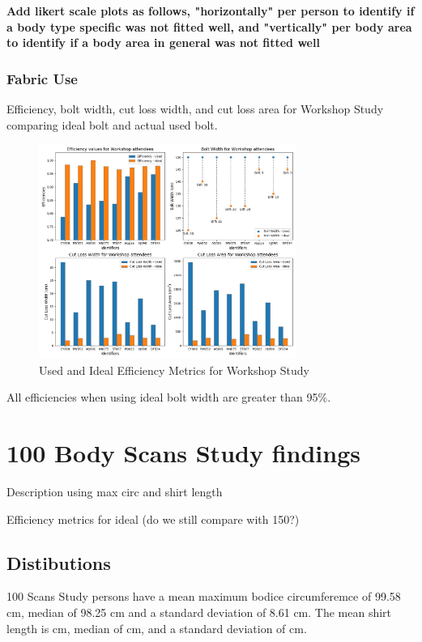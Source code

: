 \textbf{Add likert scale plots as follows, "horizontally" per person to identify if a body type specific was not fitted well, and "vertically" per body area to identify if a body area in general was not fitted well}

\subsubsection{Fabric Use}
Efficiency, bolt width, cut loss width, and cut loss area for Workshop Study comparing ideal bolt and actual used bolt.
\begin{figure} [H] %
    \centering %
    \includegraphics[width = 0.75\textwidth]{Images/Workshop_Plot.png} %
    \caption{Used and Ideal Efficiency Metrics for Workshop Study}
\end{figure}
All efficiencies when using ideal bolt width are greater than 95\%. 



\section{100 Body Scans Study findings}
Description using max circ and shirt length

Efficiency metrics for ideal (do we still compare with 150?)
\subsection{Distibutions}
100 Scans Study persons have a mean maximum bodice circumferemce of 99.58 cm, median of 98.25 cm and a standard deviation of 8.61 cm. The mean shirt length is  cm, median of  cm, and a standard deviation of  cm.

